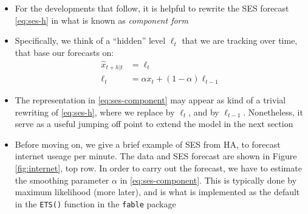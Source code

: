 \documentclass{article}
\begin{document}
\begin{itemize}
\item For the developments that follow, it is helpful to rewrite the SES forecast
  \eqref{eq:ses-h} in what is known as \emph{component form}

\item Specifically, we think of a ``hidden'' level $\ell_t$ that we are tracking
  over time, that base our forecasts on:
  \begin{equation}
  \label{eq:ses-component}
  \begin{aligned}
  \hat{x}_{t+h | t} &= \ell_t \\
  \ell_t &= \alpha x_t + (1-\alpha) \ell_{t-1}
  \end{aligned}
  \end{equation}

\item The representation in \eqref{eq:ses-component} may appear as kind of a
  trivial rewriting of \eqref{eq:ses-h}, where we replace  by $\ell_t$, and  by $\ell_{t-1}$. 
  Nonetheless, it serve as a useful jumping off point to extend the model in the 
  next section   

\item Before moving on, we give a brief example of SES from HA, to forecast
  internet useage per minute. The data and SES forecast are shown in Figure
  \ref{fig:internet}, top row. In order to carry out the forecast, we have to
  estimate the smoothing parameter $\alpha$ in \eqref{eq:ses-component}. This is 
  typically done by maximum likelihood (more later), and is what is implemented
  as the default in the \verb|ETS()| function in the \verb|fable| package 


\end{itemize}
\end{document}
